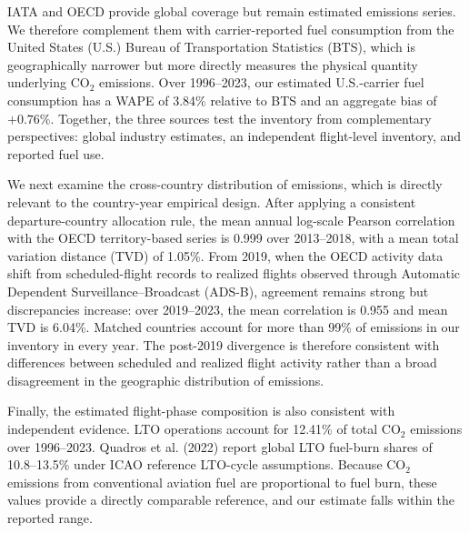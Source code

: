 \documentclass[12pt]{extarticle}
\begin{document}
IATA and OECD provide global coverage but remain estimated emissions series. We therefore complement them with carrier-reported fuel consumption from the United States (U.S.) Bureau of Transportation Statistics (BTS), which is geographically narrower but more directly measures the physical quantity underlying CO$_2$ emissions. Over 1996--2023, our estimated U.S.-carrier fuel consumption has a WAPE of 3.84\% relative to BTS and an aggregate bias of $+0.76\%$. Together, the three sources test the inventory from complementary perspectives: global industry estimates, an independent flight-level inventory, and reported fuel use.

We next examine the cross-country distribution of emissions, which is directly relevant to the country-year empirical design. After applying a consistent departure-country allocation rule, the mean annual log-scale Pearson correlation with the OECD territory-based series is 0.999 over 2013--2018, with a mean total variation distance (TVD) of 1.05\%. From 2019, when the OECD activity data shift from scheduled-flight records to realized flights observed through Automatic Dependent Surveillance--Broadcast (ADS-B), agreement remains strong but discrepancies increase: over 2019--2023, the mean correlation is 0.955 and mean TVD is 6.04\%. Matched countries account for more than 99\% of emissions in our inventory in every year. The post-2019 divergence is therefore consistent with differences between scheduled and realized flight activity rather than a broad disagreement in the geographic distribution of emissions.

Finally, the estimated flight-phase composition is also consistent with independent evidence. LTO operations account for 12.41\% of total CO$_2$ emissions over 1996--2023. Quadros et al. (2022) report global LTO fuel-burn shares of 10.8--13.5\% under ICAO reference LTO-cycle assumptions. Because CO$_2$ emissions from conventional aviation fuel are proportional to fuel burn, these values provide a directly comparable reference, and our estimate falls within the reported range.
\end{document}
